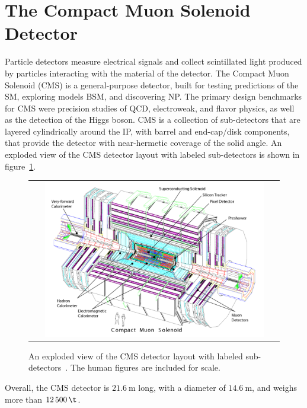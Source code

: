 \section{The Compact Muon Solenoid Detector}
Particle detectors measure electrical signals and collect scintillated light produced by particles interacting with the material of the detector.
The Compact Muon Solenoid (CMS) is a general-purpose detector, built for testing predictions of the SM, exploring models BSM, and discovering NP.
The primary design benchmarks for CMS were precision studies of QCD, electroweak, and flavor physics, as well as the detection of the Higgs boson.
CMS is a collection of sub-detectors that are layered cylindrically around the IP, with barrel and end-cap/disk components, that provide the detector with near-hermetic coverage of the solid angle.
An exploded view of the CMS detector layout with labeled sub-detectors is shown in figure~\ref{CMS_Detector}.
\begin{figure}[htb]
  \begin{center}
    \begin{tabular}{c}
        \includegraphics[width=0.9\textwidth]{fig_LHC_CMS/CMS_Detector.pdf}
    \end{tabular}
    \caption{An exploded view of the CMS detector layout with labeled sub-detectors~\cite{Bayatian:922757}.
            The human figures are included for scale.
            }
    \label{CMS_Detector}
  \end{center}
\end{figure}
Overall, the CMS detector is $\SI{21.6}{\m}$ long, with a diameter of $\SI{14.6}{\m}$, and weighs more than $\SI{12500}{\t}$.

